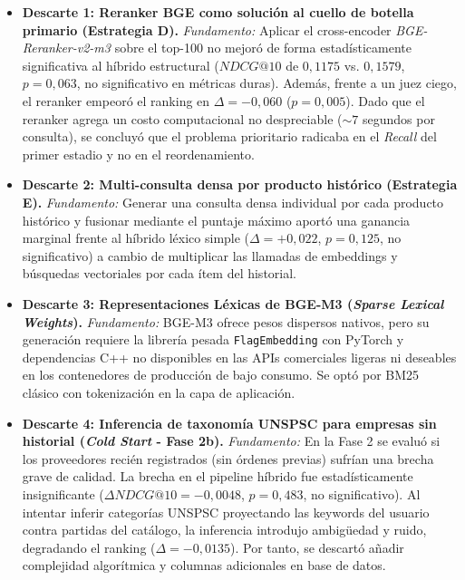 \documentclass[11pt,a4paper]{article}
\begin{document}
\begin{itemize}[leftmargin=*]
    \item \textbf{Descarte 1: Reranker BGE como solución al cuello de botella primario (Estrategia D).}
    \textit{Fundamento:} Aplicar el cross-encoder \textit{BGE-Reranker-v2-m3} sobre el top-100 no mejoró de forma estadísticamente significativa al híbrido estructural ($NDCG@10$ de $0{,}1175$ vs. $0{,}1579$, $p=0{,}063$, no significativo en métricas duras). Además, frente a un juez ciego, el reranker empeoró el ranking en $\Delta = -0{,}060$ ($p=0{,}005$). Dado que el reranker agrega un costo computacional no despreciable ($\sim 7$ segundos por consulta), se concluyó que el problema prioritario radicaba en el \textit{Recall} del primer estadio y no en el reordenamiento.
    
    \item \textbf{Descarte 2: Multi-consulta densa por producto histórico (Estrategia E).}
    \textit{Fundamento:} Generar una consulta densa individual por cada producto histórico y fusionar mediante el puntaje máximo aportó una ganancia marginal frente al híbrido léxico simple ($\Delta = +0{,}022$, $p=0{,}125$, no significativo) a cambio de multiplicar las llamadas de embeddings y búsquedas vectoriales por cada ítem del historial.
    
    \item \textbf{Descarte 3: Representaciones Léxicas de BGE-M3 (\textit{Sparse Lexical Weights}).}
    \textit{Fundamento:} BGE-M3 ofrece pesos dispersos nativos, pero su generación requiere la librería pesada \texttt{FlagEmbedding} con PyTorch y dependencias C++ no disponibles en las APIs comerciales ligeras ni deseables en los contenedores de producción de bajo consumo. Se optó por BM25 clásico con tokenización en la capa de aplicación.
    
    \item \textbf{Descarte 4: Inferencia de taxonomía UNSPSC para empresas sin historial (\textit{Cold Start} - Fase 2b).}
    \textit{Fundamento:} En la Fase 2 se evaluó si los proveedores recién registrados (sin órdenes previas) sufrían una brecha grave de calidad. La brecha en el pipeline híbrido fue estadísticamente insignificante ($\Delta NDCG@10 = -0{,}0048$, $p=0{,}483$, no significativo). Al intentar inferir categorías UNSPSC proyectando las keywords del usuario contra partidas del catálogo, la inferencia introdujo ambigüedad y ruido, degradando el ranking ($\Delta = -0{,}0135$). Por tanto, se descartó añadir complejidad algorítmica y columnas adicionales en base de datos.
\end{itemize}
\end{document}
